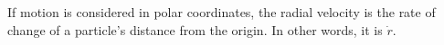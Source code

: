  If motion is considered in polar coordinates, the radial
velocity is the rate of change of a particle's distance
from the origin. In other words, it is $ \dot{r} . $
